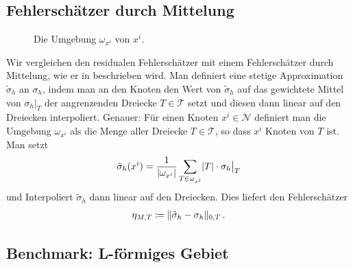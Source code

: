 \documentclass{scrartcl}
\newcommand{\cN}{\mathcal{N}}
\newcommand{\cT}{\mathcal{T}}
\newcommand{\tisigma}{\tilde{\sigma}}
\DeclarePairedDelimiter{\abs}{\lvert}{\rvert}
\DeclarePairedDelimiter{\norm}{\lVert}{\rVert}
\begin{document}
\subsection{Fehlerschätzer durch Mittelung}\label{ch:DefinitionEtaM}

\begin{figure}
\centering

\caption{Die Umgebung $\omega_{x^i}$ von $x^i$.}
\label{fig:MittellungsfehlerschaetzerKonstruktion}
\end{figure}
Wir vergleichen den residualen Fehlerschätzer mit einem Fehlerschätzer durch Mittelung, wie er in \cite[S.253f.]{Alb-2002} beschrieben wird.
Man definiert eine stetige Approximation $\tisigma_h$ an $\sigma_h$, indem man an den Knoten den Wert von $\tisigma_h$ auf das gewichtete Mittel von $\sigma_h\big\vert_T$ der angrenzenden Dreiecke $T\in\cT$ setzt und diesen dann linear auf den Dreiecken interpoliert. Genauer: Für einen Knoten $x^i\in\cN$ definiert man die Umgebung $\omega_{x^i}$ als die Menge aller Dreiecke $T\in\cT$, so dass $x^i$ Knoten von $T$ ist. Man setzt
\begin{align*}
	\tisigma_h(x^i) = \frac{1}{\abs*{\omega_{x^i}}}\sum_{T\in\omega_{x^i}}\abs{T}\cdot\sigma_h\big\vert_{T}
\end{align*}
und Interpoliert $\tisigma_h$ dann linear auf den Dreiecken.
Dies liefert den Fehlerschätzer
\begin{align*}
	\eta_{M,T}\coloneqq\norm{\tisigma_h-\sigma_h}_{0,T}\,.
\end{align*}

\newpage
\subsection{Benchmark: L-förmiges Gebiet}
\end{document}
